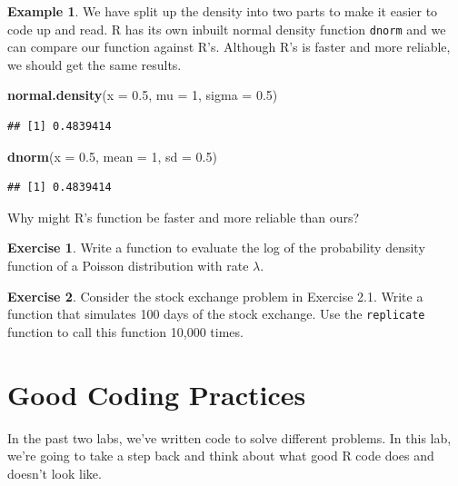 \documentclass[
]{book}
\newenvironment{Shaded}{\begin{snugshade}}{\end{snugshade}}
\newcommand{\AttributeTok}[1]{\textcolor[rgb]{0.13,0.29,0.53}{#1}}
\newcommand{\DecValTok}[1]{\textcolor[rgb]{0.00,0.00,0.81}{#1}}
\newcommand{\FloatTok}[1]{\textcolor[rgb]{0.00,0.00,0.81}{#1}}
\newcommand{\FunctionTok}[1]{\textcolor[rgb]{0.13,0.29,0.53}{\textbf{#1}}}
\newcommand{\NormalTok}[1]{#1}
\theoremstyle{definition}
\theoremstyle{definition}
\newtheorem{example}{Example}[chapter]
\theoremstyle{definition}
\newtheorem{exercise}{Exercise}[chapter]
\theoremstyle{definition}
\theoremstyle{remark}
\begin{document}
\begin{example}
We have split up the density into two parts to make it easier to code up and read. R has its own inbuilt normal density function \texttt{dnorm} and we can compare our function against R's. Although R's is faster and more reliable, we should get the same results.

\begin{Shaded}
\begin{Highlighting}[]
\FunctionTok{normal.density}\NormalTok{(}\AttributeTok{x =} \FloatTok{0.5}\NormalTok{, }\AttributeTok{mu =} \DecValTok{1}\NormalTok{, }\AttributeTok{sigma =} \FloatTok{0.5}\NormalTok{)}
\end{Highlighting}
\end{Shaded}

\begin{verbatim}
## [1] 0.4839414
\end{verbatim}

\begin{Shaded}
\begin{Highlighting}[]
\FunctionTok{dnorm}\NormalTok{(}\AttributeTok{x =} \FloatTok{0.5}\NormalTok{, }\AttributeTok{mean =} \DecValTok{1}\NormalTok{, }\AttributeTok{sd =} \FloatTok{0.5}\NormalTok{)}
\end{Highlighting}
\end{Shaded}

\begin{verbatim}
## [1] 0.4839414
\end{verbatim}

Why might R's function be faster and more reliable than ours?
\end{example}

\begin{exercise}
Write a function to evaluate the log of the probability density function of a Poisson distribution with rate \(\lambda\).
\end{exercise}

\begin{exercise}
Consider the stock exchange problem in Exercise 2.1. Write a function that simulates 100 days of the stock exchange. Use the \texttt{replicate} function to call this function 10,000 times.
\end{exercise}

\section{Good Coding Practices}\label{good-coding-practices}

In the past two labs, we've written code to solve different problems. In this lab, we're going to take a step back and think about what good R code does and doesn't look like.
\end{document}
